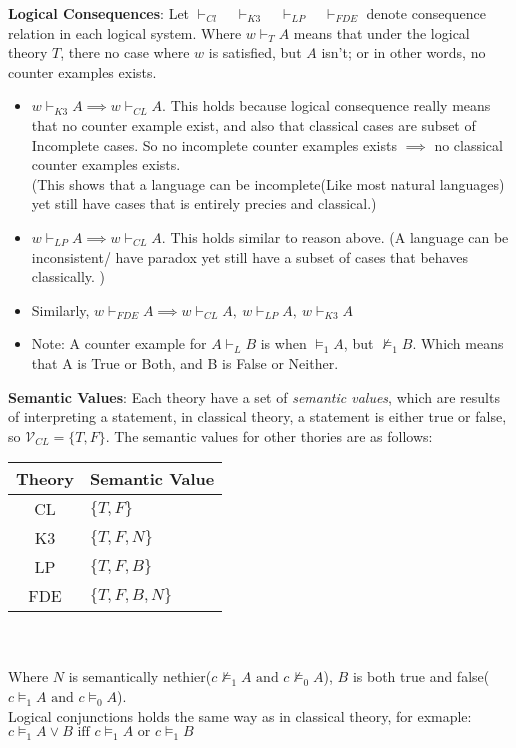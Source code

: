 \documentclass{article}
\begin{document}
\noindent \textbf{Logical Consequences}: 
Let $\vdash_{Cl}\quad \vdash_{K3} \quad \vdash_{LP}\quad \vdash_{FDE}$ denote consequence relation in each logical system. 
Where $w \vdash_T A$ means that under the logical theory $T$, there no case where $w$ is satisfied, but $A$ isn't; or in other words,
no counter examples exists.
\begin{itemize}
    \item {$w\vdash_{K3}A \implies w\vdash_{CL} A$. This holds because logical consequence really means
     that no counter example exist, and also that classical cases are subset of Incomplete cases. So no 
     incomplete counter examples exists $\implies$ no classical counter examples exists. \\
     (This shows that a language can be incomplete(Like most natural languages) yet still have cases that is entirely precies and classical.) } 
     \item {$w\vdash_{LP}A \implies w\vdash_{CL} A$. This holds similar to reason above. (A language 
     can be inconsistent/ have paradox yet still have a subset of cases that behaves classically.
     )}
     \item Similarly, $w\vdash_{FDE}A \implies w\vdash_{CL} A, \ w\vdash_{LP}A, \ w\vdash_{K3}A$
     \item {Note: A counter example for $A \vdash_L B$ is when $\models_1 A$, but $\not \models_1 B$. Which means 
     that A is True or Both, and B is False or Neither.
     }
     


\end{itemize}

\bigskip
\noindent \textbf{Semantic Values}: Each theory have a set of \emph{semantic values}, which are results of 
interpreting a statement, in classical theory, a statement is either true or false, so $\mathcal{V}_{CL} = \{T, F\}$. The 
semantic values for other thories are as follows:\\

\begin{tabular}{c|l}
    Theory & Semantic Value\\
    \hline
    CL & $\{T, F\}$\\
    K3 & $\{T, F, N\}$\\
    LP & $\{T, F, B\}$\\
    FDE & $\{T, F, B, N\}$\\

\end{tabular}\\\\
Where $N$ is semantically nethier($c \not \models_1 A \text{ and } c \not \models_0 A$), $B$ is both true and false($c  \models_1 A \text{ and } c  \models_0 A$).\\
Logical conjunctions holds the same way as in classical theory, for exmaple: \\$c \models_1 A\vee B \text{ iff } c\models_1 A \text{ or } c\models_1 B $
\end{document}
